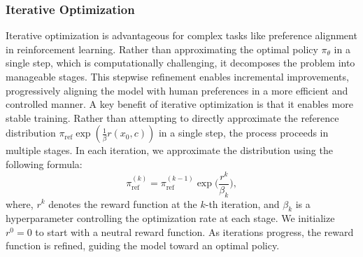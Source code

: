 \subsubsection{Iterative Optimization}

Iterative optimization is advantageous for complex tasks like preference alignment in reinforcement learning. Rather than approximating the optimal policy $\pi_\theta$ in a single step, which is computationally challenging, it decomposes the problem into manageable stages. This stepwise refinement enables incremental improvements, progressively aligning the model with human preferences in a more efficient and controlled manner. A key benefit of iterative optimization is that it enables more stable training. Rather than attempting to directly approximate the reference distribution $\pi_{\text{ref}} \exp\left(\frac{1}{\beta} r(x_0, c)\right)$ in a single step, the process proceeds in multiple stages. In each iteration, we approximate the distribution using the following formula:
\vspace{-8pt}
\small
\begin{equation}
\pi_{\text{ref}}^{(k)} = \pi_{\text{ref}}^{(k-1)} \exp\Big(\frac{r^k}{\beta_{k}} \Big),
\end{equation}
\normalsize
where, $r^k$ denotes the reward function at the $k$-th iteration, and $\beta_k$ is a hyperparameter controlling the optimization rate at each stage. We initialize $r^0 = 0$ to start with a neutral reward function. As iterations progress, the reward function is refined, guiding the model toward an optimal policy.

